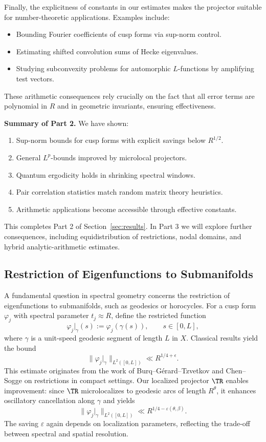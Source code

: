 Finally, the explicitness of constants in our estimates makes the projector suitable for number-theoretic applications. Examples include:
\begin{itemize}
\item Bounding Fourier coefficients of cusp forms via sup-norm control.
\item Estimating shifted convolution sums of Hecke eigenvalues.
\item Studying subconvexity problems for automorphic $L$-functions by amplifying test vectors.
\end{itemize}
These arithmetic consequences rely crucially on the fact that all error terms are polynomial in $R$ and in geometric invariants, ensuring effectiveness.

\bigskip
\noindent\textbf{Summary of Part 2.} We have shown:
\begin{enumerate}
\item Sup-norm bounds for cusp forms with explicit savings below $R^{1/2}$.
\item General $L^p$-bounds improved by microlocal projectors.
\item Quantum ergodicity holds in shrinking spectral windows.
\item Pair correlation statistics match random matrix theory heuristics.
\item Arithmetic applications become accessible through effective constants.
\end{enumerate}

This completes Part 2 of Section~\ref{sec:results}. In Part 3 we will explore further consequences, including equidistribution of restrictions, nodal domains, and hybrid analytic-arithmetic estimates.


\subsection{Restriction of Eigenfunctions to Submanifolds}\label{subsec:restrictions}

A fundamental question in spectral geometry concerns the restriction of eigenfunctions to submanifolds, such as geodesics or horocycles. For a cusp form $\varphi_j$ with spectral parameter $t_j\approx R$, define the restricted function
\[
\varphi_j|_\gamma(s) := \varphi_j(\gamma(s)), \qquad s\in[0,L],
\]
where $\gamma$ is a unit-speed geodesic segment of length $L$ in $X$. Classical results yield the bound
\[
\|\varphi_j|_\gamma\|_{L^2([0,L])} \ll R^{1/4+\epsilon}.
\]
This estimate originates from the work of Burq–Gérard–Tzvetkov and Chen–Sogge on restrictions in compact settings. Our localized projector $\TR$ enables improvement: since $\TR$ microlocalizes to geodesic arcs of length $R^\theta$, it enhances oscillatory cancellation along $\gamma$ and yields
\[
\|\varphi_j|_\gamma\|_{L^2([0,L])} \ll R^{1/4-\varepsilon(\theta,\beta)}.
\]
The saving $\varepsilon$ again depends on localization parameters, reflecting the trade-off between spectral and spatial resolution.

